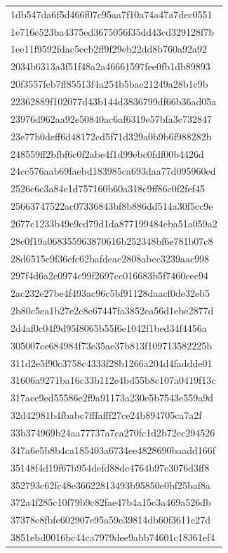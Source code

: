 \begin{tabular}{l}
1db547da6f5d466f07c95aa7f10a74a47a7dec0551 \\
1e716e523ba4375ed3675056f35dd43cd329128f7b \\
1ee11f9592fdac5ecb2ff9f29eb22dd8b760a92a92 \\
2034b6313a3f51f48a2a46661597fee0fb1db89893 \\
20f3557feb7ff85513f4a254b5bae21249a28b1c9b \\
22362889f102077d43b144d3836799df66b36ad05a \\
23976d962aa92e50840ac6af6319e57bfa3c732847 \\
23e77b0deff6d48172cd5f71d329a0b9b6f988282b \\
248559ff2bfbf6c0f2abe4f1d99ebc0fdf00b4426d \\
24cc576aab69faebd183985ca693daa77d095960ed \\
2526c6c3a84e1d757160b60a318c9ff86c0f2fef45 \\
25663747522ac07336843bf8b886dd514a30f5cc9e \\
2677c1233b49e9cd79d1da877199484eba51a059a2 \\
28c0f19a068355963870616b252348bf6e781b07c8 \\
28d6515c9f36efc62bafdeac2808abcc3239aac998 \\
297f4d6a2e0974c99f2697cc016683b5f7460eee94 \\
2ac232e27be4f493ac96c5bf91128daacf0de32eb5 \\
2b80c5ea1b27e2c8c67447fa3852ea56d1ebe2877d \\
2d4af0c04f9d95f8065b55f6e1042f1bed34f4456a \\
305007ce684984f73e35ae37b813f109713582225b \\
311d2e5f90c3758c4333f28b1266a204d4faddde01 \\
31606a9271ba16c33b112e4bd55b8c107a0419f13c \\
317ace9cd55586e2f9a91173a230e5b7543e559a9d \\
32d42981b4fbabc7fffafff27ce24b894705ca7a2f \\
33b374969b24aa77737a7ca270fc1d2b72ec294526 \\
347a6e5b8b4ca185403a6734ee4828690baadd166f \\
35148f4d19f67b954defd88de4764b97c3076d3ff8 \\
352793c62fc48e36622813493b95850e0bf25baf8a \\
372a4f285c10f79b9c82fae47b4a15c3a469a526db \\
37378e8fbfc602907e95a59e39814db60f3611c27d \\
3851ebd0016bc44ca7979dee9abb74601c18361ef4 \\

\end{tabular}
